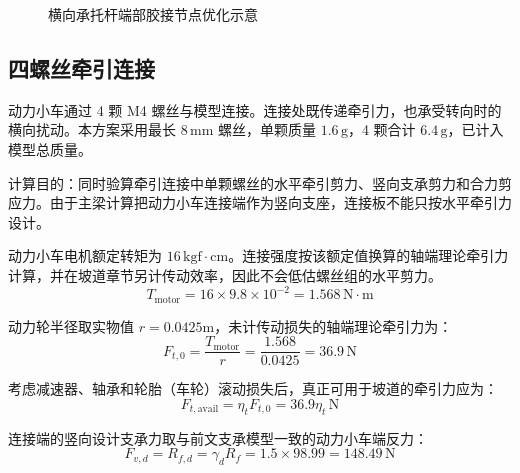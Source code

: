 \documentclass[UTF8,a4paper,12pt,fontset=none]{ctexart}
\numberwithin{equation}{section}
\numberwithin{figure}{section}
\numberwithin{table}{section}
\newcommand{\mm}{\,\mathrm{mm}}
\newcommand{\g}{\,\mathrm{g}}
\newcommand{\Nunit}{\,\mathrm{N}}
\begin{document}
\begin{figure}[H]
\centering
{}
\caption{横向承托杆端部胶接节点优化示意}
\label{fig:joint-peel}
\end{figure}

\subsection{四螺丝牵引连接}
动力小车通过 4 颗 M4 螺丝与模型连接。连接处既传递牵引力，也承受转向时的横向扰动。本方案采用最长 $8\mm$ 螺丝，单颗质量 $1.6\g$，4 颗合计 $6.4\g$，已计入模型总质量。

计算目的：同时验算牵引连接中单颗螺丝的水平牵引剪力、竖向支承剪力和合力剪应力。由于主梁计算把动力小车连接端作为竖向支座，连接板不能只按水平牵引力设计。

动力小车电机额定转矩为 $16\,\mathrm{kgf\cdot cm}$。连接强度按该额定值换算的轴端理论牵引力计算，并在坡道章节另计传动效率，因此不会低估螺丝组的水平剪力。
\begin{equation}
  T_{\mathrm{motor}}=16\times9.8\times10^{-2}=1.568\Nunit\cdot\mathrm{m}
\end{equation}

动力轮半径取实物值 $r=0.0425\mathrm{m}$，未计传动损失的轴端理论牵引力为：
\begin{equation}
  F_{t,0}=\frac{T_{\mathrm{motor}}}{r}=\frac{1.568}{0.0425}=36.9\Nunit
\end{equation}

考虑减速器、轴承和轮胎（车轮）滚动损失后，真正可用于坡道的牵引力应为：
\begin{equation}
  F_{t,\mathrm{avail}}=\eta_tF_{t,0}=36.9\eta_t\Nunit
\end{equation}

连接端的竖向设计支承力取与前文支承模型一致的动力小车端反力：
\begin{equation}
  F_{v,d}=R_{f,d}=\gamma_dR_f=1.5\times98.99=148.49\Nunit
\end{equation}
\end{document}
